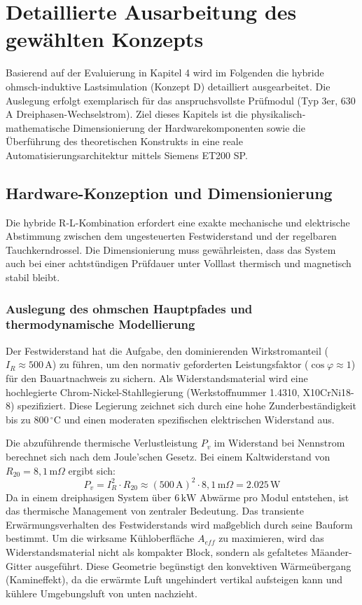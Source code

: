 

\section{Detaillierte Ausarbeitung des gewählten Konzepts}
\label{chap:ausarbeitung}

Basierend auf der Evaluierung in Kapitel 4 wird im Folgenden die hybride ohmsch-induktive Lastsimulation (Konzept D) detailliert ausgearbeitet. Die Auslegung erfolgt exemplarisch für das anspruchsvollste Prüfmodul (Typ 3er, 630\,A Dreiphasen-Wechselstrom). Ziel dieses Kapitels ist die physikalisch-mathematische Dimensionierung der Hardwarekomponenten sowie die Überführung des theoretischen Konstrukts in eine reale Automatisierungsarchitektur mittels Siemens ET200 SP.

\subsection{Hardware-Konzeption und Dimensionierung}
\label{sec:hardware_konzeption}

Die hybride R-L-Kombination erfordert eine exakte mechanische und elektrische Abstimmung zwischen dem ungesteuerten Festwiderstand und der regelbaren Tauchkerndrossel. Die Dimensionierung muss gewährleisten, dass das System auch bei einer achtstündigen Prüfdauer unter Volllast thermisch und magnetisch stabil bleibt.

\subsubsection{Auslegung des ohmschen Hauptpfades und thermodynamische Modellierung}
\label{sec:auslegung_widerstand}

Der Festwiderstand hat die Aufgabe, den dominierenden Wirkstromanteil ($I_R \approx 500\,\text{A}$) zu führen, um den normativ geforderten Leistungsfaktor ($\cos\varphi \approx 1$) für den Bauartnachweis zu sichern. Als Widerstandsmaterial wird eine hochlegierte Chrom-Nickel-Stahllegierung (Werkstoffnummer 1.4310, X10CrNi18-8) spezifiziert. Diese Legierung zeichnet sich durch eine hohe Zunderbeständigkeit bis zu $800\,^\circ\text{C}$ und einen moderaten spezifischen elektrischen Widerstand aus.

Die abzuführende thermische Verlustleistung $P_v$ im Widerstand bei Nennstrom berechnet sich nach dem Joule'schen Gesetz. Bei einem Kaltwiderstand von $R_{20} = 8,1\,\text{m}\Omega$ ergibt sich:
$$P_v = I_R^2 \cdot R_{20} \approx (500\,\text{A})^2 \cdot 8,1\,\text{m}\Omega = 2.025\,\text{W}$$
Da in einem dreiphasigen System über $6\,\text{kW}$ Abwärme pro Modul entstehen, ist das thermische Management von zentraler Bedeutung. Das transiente Erwärmungsverhalten des Festwiderstands wird maßgeblich durch seine Bauform bestimmt. Um die wirksame Kühloberfläche $A_{eff}$ zu maximieren, wird das Widerstandsmaterial nicht als kompakter Block, sondern als gefaltetes Mäander-Gitter ausgeführt. Diese Geometrie begünstigt den konvektiven Wärmeübergang (Kamineffekt), da die erwärmte Luft ungehindert vertikal aufsteigen kann und kühlere Umgebungsluft von unten nachzieht.

